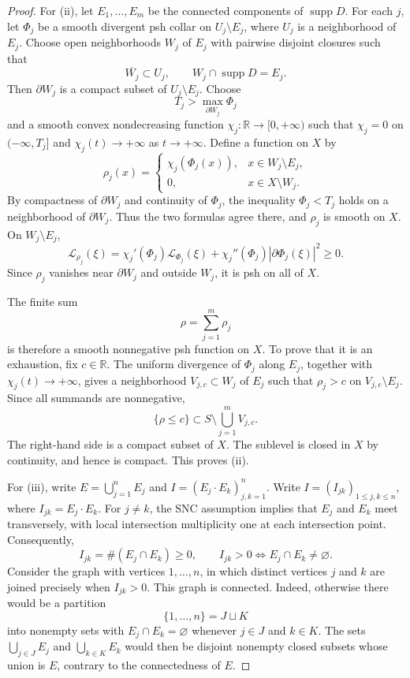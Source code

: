 \documentclass[11pt]{amsart}
\theoremstyle{definition}
\theoremstyle{remark}
\numberwithin{equation}{section}
\newcommand{\R}{\mathbb R}
\newcommand{\Levi}{\mathcal L}
\newcommand{\supp}{\operatorname{supp}}
\begin{document}
\begin{proof}
For \textup{(ii)}, let $E_1,\ldots,E_m$ be the connected
components of $\supp D$. For each $j$, let $\Phi_j$ be a smooth
divergent psh collar on $U_j\setminus E_j$, where $U_j$ is a
neighborhood of $E_j$. Choose open neighborhoods $W_j$ of $E_j$
with pairwise disjoint closures such that
\[
 \overline{W_j}\subset U_j,\qquad W_j\cap\supp D=E_j.
\]
Then $\partial W_j$ is a compact subset of $U_j\setminus E_j$.
Choose
\[
 T_j>\max_{\partial W_j}\Phi_j
\]
and a smooth convex nondecreasing function
$\chi_j:\R\to[0,+\infty)$ such that $\chi_j=0$ on
$(-\infty,T_j]$ and $\chi_j(t)\to+\infty$ as $t\to+\infty$.
Define a function on $X$ by
\[
 \rho_j(x)=
 \begin{cases}
  \chi_j(\Phi_j(x)),&x\in W_j\setminus E_j,\\
  0,&x\in X\setminus W_j.
 \end{cases}
\]
By compactness of $\partial W_j$ and continuity of $\Phi_j$,
the inequality $\Phi_j<T_j$ holds on a neighborhood of
$\partial W_j$. Thus the two formulas agree there, and $\rho_j$
is smooth on $X$. On $W_j\setminus E_j$,
\[
 \Levi_{\rho_j}(\xi)
 =\chi_j'(\Phi_j)\Levi_{\Phi_j}(\xi)
  +\chi_j''(\Phi_j)|\partial\Phi_j(\xi)|^2\ge0.
\]
Since $\rho_j$ vanishes near $\partial W_j$ and outside $W_j$,
it is psh on all of $X$.

The finite sum
\[
 \rho=\sum_{j=1}^m\rho_j
\]
is therefore a smooth nonnegative psh function on $X$.
To prove that it is an exhaustion, fix $c\in\R$.
The uniform divergence of $\Phi_j$ along $E_j$, together with
$\chi_j(t)\to+\infty$, gives a neighborhood
$V_{j,c}\subset W_j$ of $E_j$ such that
$\rho_j>c$ on $V_{j,c}\setminus E_j$.
Since all summands are nonnegative,
\[
 \{\rho\le c\}
 \subset S\setminus\bigcup_{j=1}^m V_{j,c}.
\]
The right-hand side is a compact subset of $X$.
The sublevel is closed in $X$ by continuity, and hence is compact.
This proves \textup{(ii)}.

For \textup{(iii)}, write $E=\bigcup_{j=1}^n E_j$ and
$I=(E_j\cdot E_k)_{j,k=1}^n$. Write $I=(I_{jk})_{1\le j,k\le n}$, where
$I_{jk}=E_j\cdot E_k$. For $j\ne k$, the SNC assumption
implies that $E_j$ and $E_k$ meet transversely, with local
intersection multiplicity one at each intersection point.
Consequently,
\[
  I_{jk}=\#(E_j\cap E_k)\ge0,
  \qquad
  I_{jk}>0 \Longleftrightarrow E_j\cap E_k\ne\varnothing.
\]
Consider the graph with vertices $1,\ldots,n$, in which
distinct vertices $j$ and $k$ are joined precisely when
$I_{jk}>0$. This graph is connected. Indeed, otherwise
there would be a partition
\[
  \{1,\ldots,n\}=J\sqcup K
\]
into nonempty sets with $E_j\cap E_k=\varnothing$ whenever
$j\in J$ and $k\in K$. The sets
$\bigcup_{j\in J}E_j$ and $\bigcup_{k\in K}E_k$ would then
be disjoint nonempty closed subsets whose union is $E$,
contrary to the connectedness of $E$.


\end{proof}
\end{document}
